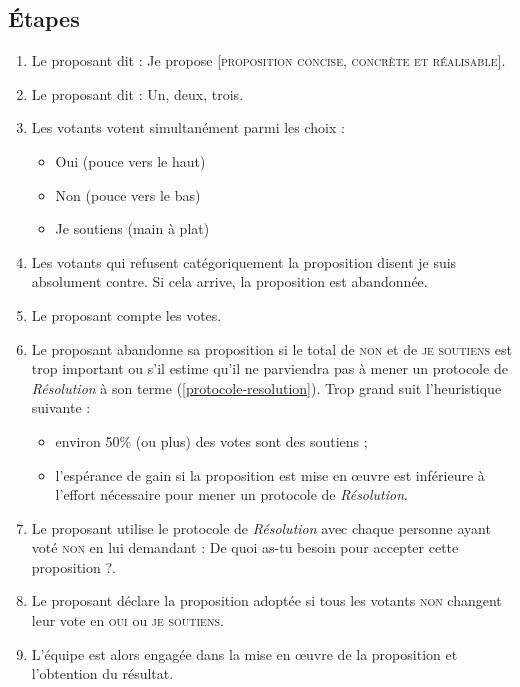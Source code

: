 \documentclass[paper=6in:9in,pagesize=pdftex,headinclude=on,footinclude=on,12pt]{scrbook}
\newcommand*{\numref}[1]{{\hyperref[{#1}]{\autoref*{#1}}}}
\begin{document}
\subsection{Étapes}
\begin{enumerate}
	\item Le proposant dit : \og{}Je propose [\textsc{proposition concise, con\-crète et réalisable}]\fg{}.
	\item Le proposant dit : \og{}Un, deux, trois\fg{}.
	\item Les votants votent simultanément parmi les choix :
	      \begin{itemize}
	      	\item Oui (pouce vers le haut)
	      	\item Non (pouce vers le bas)
	      	\item Je soutiens (main à plat)
	      \end{itemize}
	\item Les votants qui refusent catégoriquement la proposition disent \og{}je suis absolument contre\fg{}. Si cela arrive, la proposition est abandonnée.
	\item Le proposant compte les votes.
	\item Le proposant abandonne sa proposition si le total de \textsc{non} et de \textsc{je soutiens} est trop important ou s'il estime qu'il ne parviendra
	      pas à mener un protocole de \emph{Résolution} à son terme (\numref{protocole-resolution}). \og{}Trop grand\fg{} suit l'heuristique suivante :
	      \begin{itemize}
	      	\item environ 50\% (ou plus) des votes sont des soutiens ;
	      	\item l'espérance de gain si la proposition est mise en œuvre est inférieure à l'effort nécessaire pour mener un protocole de \emph{Résolution}.
	      \end{itemize}
	\item Le proposant utilise le protocole de \emph{Résolution} avec chaque personne ayant voté \textsc{non} en lui demandant : \og{}De quoi as-tu besoin pour
	      accepter cette proposition ?\fg{}.
	\item Le proposant déclare la proposition adoptée si tous les votants \textsc{non} changent leur vote en \textsc{oui} ou \textsc{je soutiens}.
	\item L'équipe est alors engagée dans la mise en œuvre de la proposition et l'obtention du résultat.
\end{enumerate}
\end{document}
